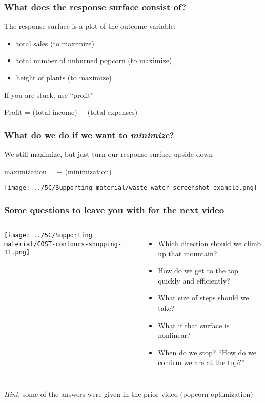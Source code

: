 \begin{frame}\frametitle{What does the response surface consist of?}
	
	The response surface is a plot of the outcome variable:
	\begin{itemize}
		\item	total sales (to maximize)
		\item	total number of unburned popcorn (to maximize)
		\item	height of plants (to maximize)
	\end{itemize}
	\vspace{1cm}
	If you are stuck, use ``profit''
	\begin{exampleblock}{}
		\centerline{\color{myGreen}Profit = (total income) $-$ (total expenses)}
	\end{exampleblock}
	
\end{frame}

\begin{frame}\frametitle{What do we do if we want to \emph{\textbf{minimize}}?}
	
	We still maximize, but just turn our response surface upside-down
	
	\vspace{.5cm}
	\begin{exampleblock}{}
		\centerline{\color{myGreen}maximization = $-$ (minimization)}
	\end{exampleblock}
	\centerline{\texttt{[image: ../5C/Supporting material/waste-water-screenshot-example.png]}}
	
\end{frame}

\begin{frame}\frametitle{Some questions to leave you with for the next video }
	\begin{columns}[c]
			\centerline{\texttt{[image: ../5C/Supporting material/COST-contours-shopping-11.png]}}

			\begin{itemize}
				\item	Which direction should we climb up that mountain? 
				\item	How do we get to the top quickly and efficiently? \pause
				\item	What size of steps should we take? \pause
				\item	What if that surface is nonlinear? \pause
				\item	When do we stop? ``How do we confirm we are at the top?''
			\end{itemize}
	\end{columns}
	 
	\pause
	\vspace{1cm}
	{\color{myOrange}\emph{Hint}: some of the answers were given in the prior video (popcorn optimization)}
\end{frame}
